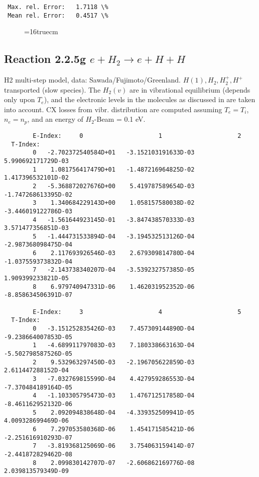 \documentclass[12pt,dvipdfmx]{article}
\begin{document}
{\begin{small}
\begin{verbatim}
 Max. rel. Error:   1.7118 \%
 Mean rel. Error:   0.4517 \%

\end{verbatim}\end{small}
\begin{figure} \label{2.2.5}
\epsfxsize=16truecm
\end{figure}
\newpage


\subsection{
Reaction 2.2.5g   $e + H_2   \rightarrow e + H + H  $
}

H2 multi-step model,
data: Sawada/Fujimoto/Greenland.
$  H(1), H_2, H_2^+, H^+ $ transported (slow species).
The $H_2(v)$ are in vibrational equilibrium
(depends only upon $T_e$), and the electronic levels
in the molecules as discussed in \cite{kn:Sawada} are taken into
account. CX losses from vibr. distribution are computed assuming $T_e =
T_i$, $n_e = n_p$, and an energy of $H_2$-Beam  = 0.1 eV.
\begin{small}\begin{verbatim}
        E-Index:     0                     1                     2
  T-Index:
        0   -2.702372540584D+01   -3.152103191633D-03    5.990692171729D-03
        1    1.081756417479D+01   -1.487216964825D-02    1.417396532101D-02
        2   -5.368872027676D+00    5.419787589654D-03   -1.747268613395D-02
        3    1.340684229143D+00    1.058157580038D-02   -3.446019122786D-03
        4   -1.561644923145D-01   -3.847438570333D-03    3.571477356851D-03
        5   -1.444731533894D-04   -3.194532513126D-04   -2.987368098475D-04
        6    2.117693926546D-03    2.679309814780D-04   -1.037559373832D-04
        7   -2.143738340207D-04   -3.539232757385D-05    1.909399233821D-05
        8    6.979740947331D-06    1.462031952352D-06   -8.858634506391D-07

        E-Index:     3                     4                     5
  T-Index:
        0   -3.151252835426D-03    7.457309144890D-04   -9.238664007853D-05
        1   -4.689911797083D-03    7.180338663163D-04   -5.502798587526D-05
        2    9.532963297450D-03   -2.196705622859D-03    2.611447288152D-04
        3   -7.032769815599D-04    4.427959286553D-04   -7.370484189164D-05
        4   -1.103305795473D-03    1.476712517858D-04   -8.461162952132D-06
        5    2.092094838648D-04   -4.339352509941D-05    4.009328699469D-06
        6    7.297053580368D-06    1.454171585421D-06   -2.251616910293D-07
        7   -3.819368125069D-06    3.754063159414D-07   -2.441872829462D-08
        8    2.099830142707D-07   -2.606862169776D-08    2.039813579349D-09


\end{verbatim}
\end{small}}
\end{document}
